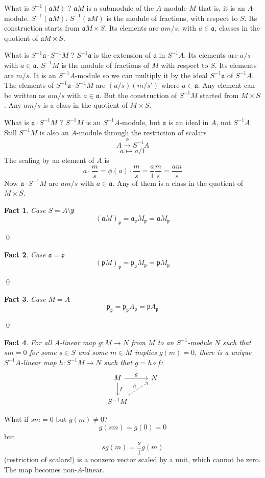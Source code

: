 \documentclass{article}
\newcommand{\mf}{\mathfrak}
\newcommand{\aaa}{\mf a}
\newcommand{\ppp}{\mf p}
\newtheorem{theorem}{Fact}[section]
\begin{document}
What is $S^{-1}(\aaa M)$ ? $\aaa M$ is a submodule of the $A$-module $M$ that is, it is an $A$-module. $S^{-1}(\aaa M)$. $S^{-1}(\aaa M)$ is the module of fractions, with respect to $S$. Its construction starts from $\aaa M \times S$. Its elements are $am/s$, with $a \in \aaa$, classes in the quotient of $\aaa M \times S$.

What is $S^{-1}\aaa \cdot S^{-1}M$ ? $S^{-1}\aaa$ is the extension of $\aaa$ in $S^{-1}A$. Its elements are $a/s$ with $a \in \aaa$. $S^{-1}M$ is the module of fractions of $M$ with respect to $S$. Its elements are $m/s$. It is an $S^{-1}A$-module so we can multiply it by the ideal $S^{-1}\aaa$ of $S^{-1}A$. The elements of $S^{-1}\aaa \cdot S^{-1}M$ are $(a/s)(m/s')$ where $a \in \aaa$. Any element can be written as $am/s$ with $a \in \aaa$. But the construction of $S^{-1}M$ started from $M \times S$. Any $am/s$ is a class in the quotient of $M \times S$.

What is $\aaa \cdot S^{-1}M$ ? $S^{-1}M$ is an $S^{-1}A$-module, but $\aaa$ is an ideal in $A$, not $S^{-1}A$. Still $S^{-1}M$ is also an $A$-module through the restriction of scalars
\[
A \overset{\phi}\rightarrow S^{-1}A
\]
\[
a \mapsto a/1
\]
The scaling by an element of $A$ is
\[
a \cdot \frac{m}{s} = \phi(a) \cdot \frac{m}{s} = \frac{a}{1}\frac{m}{s} = \frac{am}{s}
\]
Now $\aaa \cdot S^{-1}M$ are $am/s$ with $a \in \aaa$. Any of them is a class in the quotient of $M \times S$.

\vspace{1.5em}
\begin{theorem}
Case $S = A\setminus\ppp$
\[
(\aaa M)_\ppp = \aaa_\ppp M_\ppp = \aaa M_\ppp
\]
\end{theorem}
\qed

\begin{theorem}
Case $\aaa = \ppp$
\[
(\ppp M)_\ppp = \ppp_\ppp M_\ppp = \ppp M_\ppp
\]
\end{theorem}
\qed

\begin{theorem}
Case $M = A$
\[
\ppp_\ppp = \ppp_\ppp A_\ppp = \ppp A_\ppp
\]
\end{theorem}
\qed

\begin{theorem}
For all $A$-linear map $g: M \rightarrow N$ from $M$ to an $S^{-1}$-module $N$ such that $sm = 0$ for some $s \in S$ and some $m \in M$ implies $g(m) = 0$, there is a unique $S^{-1}A$-linear map $h: S^{-1}M \rightarrow N$ such that $g = h \circ f$:
\[
     \begin{tikzcd}
     M \arrow{r}{g} \arrow{d}{f} & N \\
     S^{-1}M \arrow[dashrightarrow]{ur}{h}
     \end{tikzcd}
\]
\end{theorem}
\noindent
What if $sm = 0$ but $g(m) \neq 0$?
\[
g(sm) = g(0) = 0 
\]
but 
\[
sg(m) = \frac{s}{1}g(m)
\]
(restriction of scalars!) is a nonzero vector scaled by a unit, which cannot be zero. The map becomes non-$A$-linear.
\end{document}
